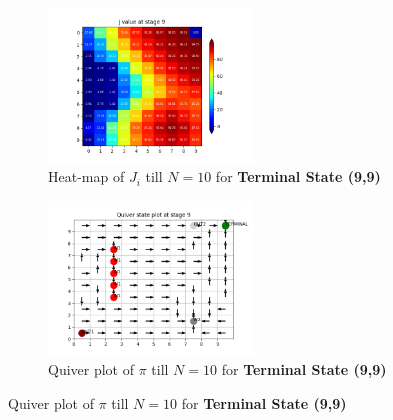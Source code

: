 \begin{figure}[h]
\begin{subfigure}
\centering
\includegraphics[angle=0,width=0.6\textwidth]{hw2/logs/t=99_N=10/J-heatmap-9.png}
\caption{Heat-map of $J_i$ till $N=10$ for \textbf{Terminal State (9,9)}}
\end{subfigure}

\begin{subfigure}
\centering
\includegraphics[angle=0,width=0.6\textwidth]{hw2/logs/t=99_N=10/quiver-9.png}
\caption{Quiver plot of $\pi$ till $N=10$ for \textbf{Terminal State (9,9)}}
\end{subfigure}
\end{figure}

